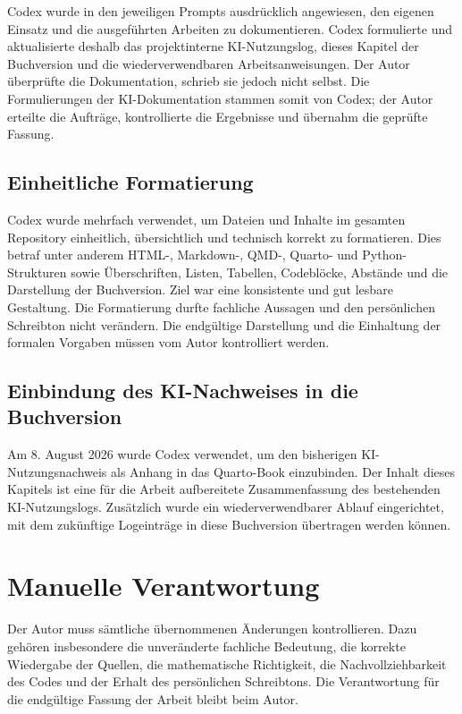 \documentclass[
  ngerman,
  a4paper,
  DIV=11,
  oneside]{scrreprt}
\begin{document}
Codex wurde in den jeweiligen Prompts ausdrücklich angewiesen, den
eigenen Einsatz und die ausgeführten Arbeiten zu dokumentieren. Codex
formulierte und aktualisierte deshalb das projektinterne KI-Nutzungslog,
dieses Kapitel der Buchversion und die wiederverwendbaren
Arbeitsanweisungen. Der Autor überprüfte die Dokumentation, schrieb sie
jedoch nicht selbst. Die Formulierungen der KI-Dokumentation stammen
somit von Codex; der Autor erteilte die Aufträge, kontrollierte die
Ergebnisse und übernahm die geprüfte Fassung.

\subsection{Einheitliche Formatierung}\label{einheitliche-formatierung}

Codex wurde mehrfach verwendet, um Dateien und Inhalte im gesamten
Repository einheitlich, übersichtlich und technisch korrekt zu
formatieren. Dies betraf unter anderem HTML-, Markdown-, QMD-, Quarto-
und Python-Strukturen sowie Überschriften, Listen, Tabellen, Codeblöcke,
Abstände und die Darstellung der Buchversion. Ziel war eine konsistente
und gut lesbare Gestaltung. Die Formatierung durfte fachliche Aussagen
und den persönlichen Schreibton nicht verändern. Die endgültige
Darstellung und die Einhaltung der formalen Vorgaben müssen vom Autor
kontrolliert werden.

\subsection{Einbindung des KI-Nachweises in die
Buchversion}\label{einbindung-des-ki-nachweises-in-die-buchversion}

Am 8. August 2026 wurde Codex verwendet, um den bisherigen
KI-Nutzungsnachweis als Anhang in das Quarto-Book einzubinden. Der
Inhalt dieses Kapitels ist eine für die Arbeit aufbereitete
Zusammenfassung des bestehenden KI-Nutzungslogs. Zusätzlich wurde ein
wiederverwendbarer Ablauf eingerichtet, mit dem zukünftige Logeinträge
in diese Buchversion übertragen werden können.

\section{Manuelle Verantwortung}\label{manuelle-verantwortung}

Der Autor muss sämtliche übernommenen Änderungen kontrollieren. Dazu
gehören insbesondere die unveränderte fachliche Bedeutung, die korrekte
Wiedergabe der Quellen, die mathematische Richtigkeit, die
Nachvollziehbarkeit des Codes und der Erhalt des persönlichen
Schreibtons. Die Verantwortung für die endgültige Fassung der Arbeit
bleibt beim Autor.
\end{document}
